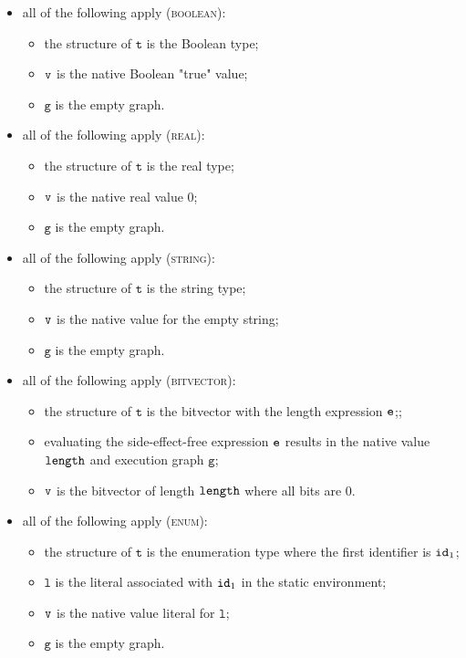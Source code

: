\documentclass{book}
\newcommand\ErrorConfig[0]{\hyperlink{def-errorconfig}{\texttt{\#DE}}}
\newcommand\ProseOrError[0]{\ProseTerminateAs{\ErrorConfig}}
\newcommand\vg[0]{\texttt{g}}
\newcommand\vl[0]{\texttt{l}}
\newcommand\vt[0]{\texttt{t}}
\begin{document}
\begin{itemize}
  \item all of the following apply (\textsc{boolean}):
  \begin{itemize}
    \item the structure of $\vt$ is the Boolean type;
    \item $\texttt{v}$ is the native Boolean "true" value;
    \item $\vg$ is the empty graph.
  \end{itemize}

  \item all of the following apply (\textsc{real}):
  \begin{itemize}
    \item the structure of $\vt$ is the real type;
    \item $\texttt{v}$ is the native real value $0$;
    \item $\vg$ is the empty graph.
  \end{itemize}

  \item all of the following apply (\textsc{string}):
  \begin{itemize}
    \item the structure of $\vt$ is the string type;
    \item $\texttt{v}$ is the native value for the empty string;
    \item $\vg$ is the empty graph.
  \end{itemize}

  \item all of the following apply (\textsc{bitvector}):
  \begin{itemize}
    \item the structure of $\vt$ is the bitvector with the length expression $\texttt{e}$;;
    \item evaluating the side-effect-free expression $\texttt{e}$ results in the native value $\texttt{length}$
    and execution graph $\vg$\ProseOrError;
    \item $\texttt{v}$ is the bitvector of length $\texttt{length}$ where all bits are $0$.
  \end{itemize}

  \item all of the following apply (\textsc{enum}):
  \begin{itemize}
    \item the structure of $\vt$ is the enumeration type where the first identifier is $\texttt{id}_1$;
    \item $\vl$ is the literal associated with $\texttt{id}_1$ in the static environment;
    \item $\texttt{v}$ is the native value literal for $\vl$;
    \item $\vg$ is the empty graph.
  \end{itemize}


\end{itemize}
\end{document}
